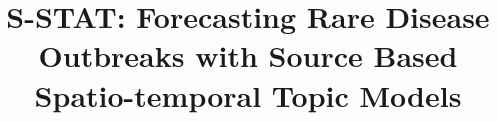 \documentclass{sig-alternate}
\newcommand{\model}{{S-STAT}\xspace} %
\begin{document}

\title{\model: Forecasting Rare Disease Outbreaks with Source Based Spatio-temporal Topic Models}

\end{document}
